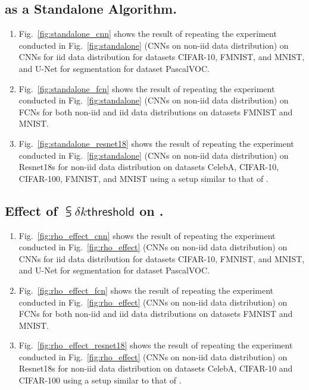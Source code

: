 \subsection{{\tt \algName} as a Standalone Algorithm.}
\label{app:standalone_expt}
\begin{enumerate}[leftmargin=5mm]
    \item Fig.~\ref{fig:standalone_cnn} shows the result of repeating the experiment conducted in Fig.~\ref{fig:standalone} (CNNs on non-iid data distribution) on CNNs for iid data distribution for datasets CIFAR-10, FMNIST, and MNIST, and U-Net for segmentation for dataset PascalVOC. 
    \item Fig.~\ref{fig:standalone_fcn} shows the result of repeating the experiment conducted in Fig.~\ref{fig:standalone} (CNNs on non-iid data distribution) on FCNs for both non-iid and iid data distributions on datasets FMNIST and MNIST.
    \item Fig.~\ref{fig:standalone_resnet18} shows the result of repeating the experiment conducted in Fig.~\ref{fig:standalone} (CNNs on non-iid data distribution) on Resnet18s for non-iid data distribution on datasets CelebA, CIFAR-10, CIFAR-100, FMNIST, and MNIST using a setup similar to that of \cite{wang2018atomo}.
\end{enumerate}



\subsection{Effect of $\subsup{\delta}{k}{\mathsf{threshold}}$ on {\algName}.}
\label{app:rho_effect}
\begin{enumerate}[leftmargin=5mm]
    \item Fig.~\ref{fig:rho_effect_cnn} shows the result of repeating the experiment conducted in Fig.~\ref{fig:rho_effect} (CNNs on non-iid data distribution) on CNNs for iid data distribution for datasets CIFAR-10, FMNIST, and MNIST, and U-Net for segmentation for dataset PascalVOC.
    \item Fig.~\ref{fig:rho_effect_fcn} shows the result of repeating the experiment conducted in Fig.~\ref{fig:rho_effect} (CNNs on non-iid data distribution) on FCNs for both non-iid and iid data distributions on datasets FMNIST and MNIST.
    \item Fig.~\ref{fig:rho_effect_resnet18} shows the result of repeating the experiment conducted in Fig.~\ref{fig:rho_effect} (CNNs on non-iid data distribution) on Resnet18s for non-iid data distribution on datasets CelebA, CIFAR-10 and CIFAR-100 using a setup similar to that of \cite{wang2018atomo}.
\end{enumerate}



